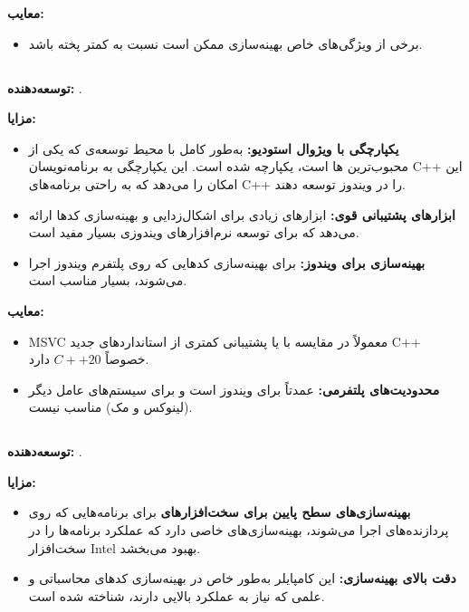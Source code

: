 \documentclass[12pt, a4paper]{report}
\begin{document}
\textbf{معایب:}
\begin{itemize}
	\item برخی از ویژگی‌های خاص بهینه‌سازی  ممکن است نسبت به  کمتر پخته باشد.
\end{itemize}

\subsection{}
\textbf{توسعه‌دهنده:} .

\textbf{مزایا:}
\begin{itemize}
	\item \textbf{یکپارچگی با ویژوال استودیو:}  به‌طور کامل با محیط توسعه‌ی  که یکی از محبوب‌ترین  ها است، یکپارچه شده است. این یکپارچگی به برنامه‌نویسان C++ این امکان را می‌دهد که به راحتی برنامه‌های C++ را در ویندوز توسعه دهند.
	\item \textbf{ابزارهای پشتیبانی قوی:}  ابزارهای زیادی برای اشکال‌زدایی و بهینه‌سازی کدها ارائه می‌دهد که برای توسعه نرم‌افزارهای ویندوزی بسیار مفید است.
	\item \textbf{بهینه‌سازی برای ویندوز:}  برای بهینه‌سازی کدهایی که روی پلتفرم ویندوز اجرا می‌شوند، بسیار مناسب است.
\end{itemize}

\textbf{معایب:}
\begin{itemize}
	\item MSVC معمولاً در مقایسه با  یا  پشتیبانی کمتری از استانداردهای جدید C++ خصوصاً \( C++20 \) دارد.
	\item \textbf{محدودیت‌های پلتفرمی:}  عمدتاً برای ویندوز است و برای سیستم‌های عامل دیگر (لینوکس و مک) مناسب نیست.
\end{itemize}

\subsection{}
\textbf{توسعه‌دهنده:} .

\textbf{مزایا:}
\begin{itemize}
	\item \textbf{بهینه‌سازی‌های سطح پایین برای سخت‌افزارهای }  برای برنامه‌هایی که روی پردازنده‌های  اجرا می‌شوند، بهینه‌سازی‌های خاصی دارد که عملکرد برنامه‌ها را در سخت‌افزار Intel بهبود می‌بخشد.
	\item \textbf{دقت بالای بهینه‌سازی:} این کامپایلر به‌طور خاص در بهینه‌سازی کدهای محاسباتی و علمی که نیاز به عملکرد بالایی دارند، شناخته شده است.
\end{itemize}
\end{document}
